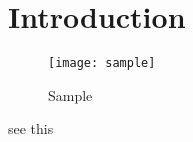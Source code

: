 \section{Introduction}
\label{s:intro}

\begin{figure}[h]
	\centering
	\texttt{[image: sample]}
	\caption{Sample}
	\label{f:sample}
\end{figure}

see this~\cite{latex}